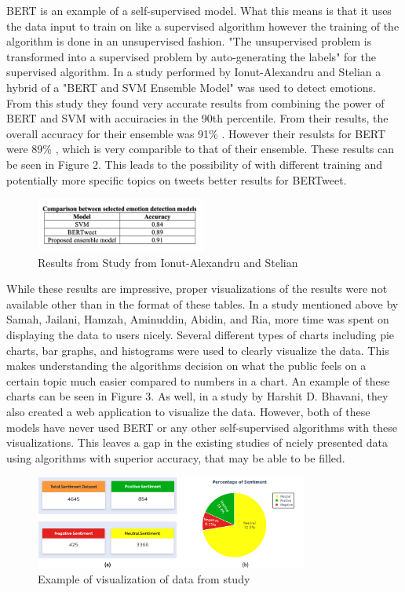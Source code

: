 \documentclass[conference]{IEEEtran}
\begin{document}
BERT is an example of a self-supervised model. 
What this means is that it uses the data input to train on like a supervised algorithm however the training of the algorithm is done in an unsupervised fashion.
"The unsupervised problem is transformed into a supervised problem by auto-generating the labels\cite{b9}" for the supervised algorithm.
In a study performed by Ionut-Alexandru and Stelian a hybrid of a "BERT and SVM Ensemble Model\cite{b8}" was used to detect emotions.
From this study they found very accurate results from combining the power of BERT and SVM with accuiracies in the 90th percentile.
From their results, the overall accuracy for their ensemble was 91\% \cite{b8}.
However their resulsts for BERT were 89\% \cite{b8}, which is very comparible to that of their ensemble.
These results can be seen in Figure 2.
This leads to the possibility of with different training and potentially more specific topics on tweets better results for BERTweet.

\begin{figure}[b]
    \centerline{\includegraphics[width=0.5\textwidth]{BERTweetChartFromStudy.png}}
    \caption{Results from Study from Ionut-Alexandru and Stelian\cite{b8}}
\end{figure}

While these results are impressive, proper visualizations of the results were not available other than in the format of these tables.
In a study mentioned above by Samah, Jailani, Hamzah, Aminuddin, Abidin, and Ria, more time was spent on displaying the data to users nicely.
Several different types of charts including pie charts, bar graphs, and histograms were used to clearly visualize the data.
This makes understanding the algorithms decision on what the public feels on a certain topic much easier compared to numbers in a chart.
An example of these charts can be seen in Figure 3. 
As well, in a study by Harshit D. Bhavani, they also created a web application to visualize the data\cite{b3}. 
However, both of these models have never used BERT or any other self-supervised algorithms with these visualizations.
This leaves a gap in the existing studies of nciely presented data using algorithms with superior accuracy, that may be able to be filled. 

\begin{figure}[t]
    \centering
    \includegraphics[width=0.8\textwidth]{BetterVisualizationsOfData.png}
    \caption{Example of visualization of data from study\cite{b2}}
\end{figure}
\end{document}
